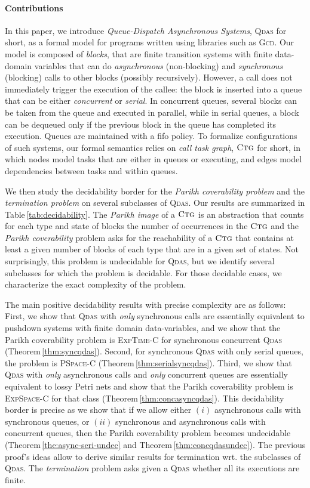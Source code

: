 \documentclass[runningheads,oribibl,]{article}
\renewcommand{\gcd}{\textsc{Gcd}\xspace}
\newcommand{\qdas}{\textsc{Qdas}\xspace}
\newcommand{\fifo}{fifo\xspace}
\newcommand{\dexpspacecomplete}{\textsc{ExpSpace-C}\xspace}
\newcommand{\pspacecomplete}{\textsc{PSpace-C}\xspace}
\newcommand{\dexptimecomplete}{\textsc{ExpTime-C}\xspace}
\newcommand{\ctg}{\ensuremath{\textsc{Ctg}}\xspace}
\begin{document}
\paragraph{{\bf Contributions}}
In this paper, we introduce {\em Queue-Dispatch Asynchronous Systems},
\qdas for short, as a formal model for programs written using
libraries such as \gcd.  Our model is composed of {\em blocks}, that
are finite transition systems with finite data-domain variables that
can do {\em asynchronous} (non-blocking) and {\em synchronous}
(blocking) calls to other blocks (possibly recursively). However, a
call does not immediately trigger the execution of the callee: the
block  is inserted into a queue that can be either {\em
  concurrent} or {\em serial}. In concurrent queues, several blocks
can be taken from the queue and executed in parallel, while in serial
queues, a block can be dequeued only if the previous block in the
queue has completed its execution. Queues are maintained with a \fifo
policy. To formalize configurations of such systems, our formal
semantics relies on {\em call task graph}, \ctg for short, in which
nodes model tasks that are either in queues or executing, and edges
model dependencies between tasks and within queues.

We then study the decidability border for the {\em Parikh coverability
problem} and the \emph{termination problem}
on several subclasses of \qdas. Our results are summarized in Table\,\ref{tab:decidability}. The {\em Parikh image} of a
\ctg is an abstraction that counts for each type and state of blocks
the number of occurrences in the \ctg and the {\em Parikh
  coverability} problem asks for the reachability of a \ctg that
contains at least a given number of blocks of each type that are in a given set
of states. Not
surprisingly, this problem is undecidable for \qdas, but we identify
several subclasses for which the problem is decidable. For those
decidable cases, we characterize the exact complexity of the
problem.

The main positive decidability results with precise complexity are as
follows:  First, we show that \qdas with {\em only} synchronous calls
are essentially equivalent to pushdown systems with finite domain
data-variables, and we show that the Parikh coverability problem is
\dexptimecomplete for synchronous concurrent \qdas
(Theorem\,\ref{thm:syncqdas}). Second, for synchronous \qdas with only
serial queues, the problem is \pspacecomplete
(Theorem\,\ref{thm:serialsyncqdas}). Third, we show that \qdas with
{\em only} asynchronous calls and {\em only} concurrent queues are
essentially equivalent to lossy Petri nets and show that the
Parikh coverability problem is \dexpspacecomplete for that class
(Theorem\,\ref{thm:concasyncqdas}). This decidability border is precise
as we show that if we allow either $(i)$ asynchronous calls with
synchronous queues, or $(ii)$ synchronous and asynchronous calls with
concurrent queues, then the Parikh coverability problem becomes
undecidable (Theorem\,\ref{the:async-seri-undec} and
Theorem\,\ref{thm:concqdasundec}). The previous proof's ideas allow
to derive similar results for
termination wrt. the subclasses of \qdas.
The \emph{termination} problem asks given a \qdas whether all its
executions are finite.
\end{document}
